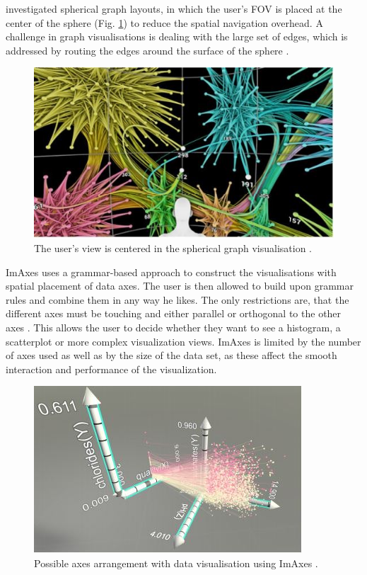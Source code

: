\newline\cite[]{Kwon2016} investigated spherical graph layouts, in which the user's \ac{FOV} is placed at the center of the sphere (Fig. \ref{figure:SpericalGraphCenteredView}) to reduce the spatial navigation overhead. A challenge in graph visualisations is dealing with the large set of edges, which is addressed by routing the edges around the surface of the sphere \autocite[1803]{Kwon2016}.
\begin{figure}[!ht]
    \centering
	\includegraphics[width=0.49 \textwidth]{images/Kwon2016_sphericalgraphlayout_centereduser.jpg}
	\caption{
		The user's view is centered in the spherical graph visualisation  \autocite{Kwon2016}.
	}
	\label{figure:SpericalGraphCenteredView}
\end{figure}
ImAxes uses a grammar-based approach to construct the visualisations with spatial placement of data axes. The user is then allowed to build upon grammar rules and combine them in any way he likes. The only restrictions are, that the different axes must be touching and either parallel or orthogonal to the other axes \autocite[]{Cordeil2017a}. This allows the user to decide whether they want to see a histogram, a scatterplot or more complex visualization views. ImAxes is limited by the number of axes used as well as by the size of the data set, as these affect the smooth interaction and performance of the visualization.
\begin{figure}[!ht]
    \centering
	\includegraphics[width=0.49 \textwidth]{images/Cordeil_ImAxes.jpg}
	\caption{
		Possible axes arrangement with data visualisation using ImAxes \autocite{Cordeil2017a}.
	}
	\label{figure:ImAxes}
\end{figure}
